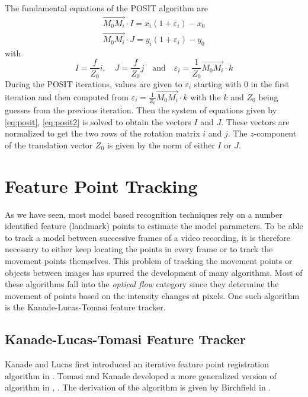\documentclass[11pt,a4paper]{report}
\begin{document}
The fundamental equations of the POSIT algorithm are
\begin{gather}\label{eq:posit}
\overrightarrow{M_0M_i}\cdot I  = x_i(1+\varepsilon_i) - x_0\\
\label{eq:posit2}
\overrightarrow{M_0M_i}\cdot J  = y_i(1+\varepsilon_i) - y_0
\end{gather}
with
\begin{equation*}
I = \frac{f}{Z_0}i \mathrm{, }\quad J = \frac{f}{Z_0}j \quad \mathrm{and} \quad
\varepsilon_i = \frac{1}{Z_0}\overrightarrow{M_0M_i} \cdot k
\end{equation*}
During the POSIT iterations, values are given to $\varepsilon_i$ starting with
0 in the first iteration and then computed from $\varepsilon_i =
\frac{1}{Z_0}\overrightarrow{M_0M_i} \cdot k$ with the $k$ and $Z_0$ being guesses from the
previous iteration. Then the system of equations given by \ref{eq:posit},
\ref{eq:posit2} is solved to obtain the vectors $I$ and $J$. These vectors are
normalized to get the two rows of the rotation matrix $i$ and $j$. The
$z$-component of the translation vector $Z_0$ is given by the norm of either $I$
or $J$.

\section{Feature Point Tracking}
As we have seen, most model based recognition techniques rely on a number identified feature
(landmark) points to estimate the model parameters. To be able to track a model
between successive frames of a video recording, it is therefore necessary to
either keep locating the points in every frame or to track the movement points
themselves. This problem of tracking the movement points or objects between
images has spurred the development of many algorithms. Most of these algorithms
fall into the \textit{optical flow} category since they determine the movement
of points based on the intensity changes at pixels. One such algorithm is the
Kanade-Lucas-Tomasi feature tracker.
\subsection{Kanade-Lucas-Tomasi Feature Tracker}\label{s:kanade}
Kanade and Lucas first introduced an iterative feature point registration algorithm in
\cite{kanade}. Tomasi and Kanade developed a more generalized version of
algorithm in \cite{kanade2}, \cite{kanade3}. The derivation of the algorithm is
given by Birchfield in \cite{kanade4}.
\end{document}
